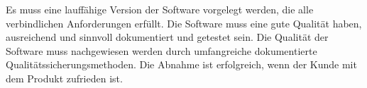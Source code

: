 Es muss eine lauffähige Version der Software vorgelegt werden, die alle verbindlichen Anforderungen erfüllt. Die Software muss eine gute Qualität haben, ausreichend und sinnvoll dokumentiert und getestet sein. Die Qualität der Software muss nachgewiesen werden durch umfangreiche dokumentierte Qualitätssicherungsmethoden. Die Abnahme ist erfolgreich, wenn der Kunde mit dem Produkt zufrieden ist.
